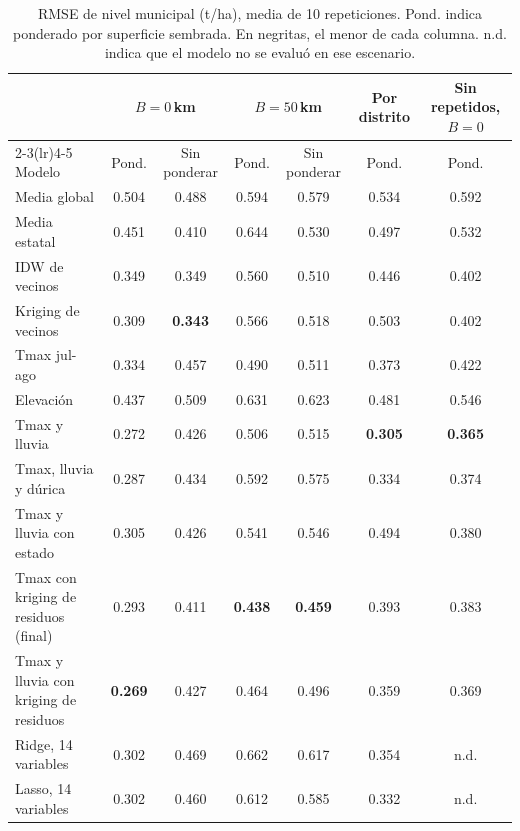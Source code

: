 \begin{table}[t]
\centering
\caption{RMSE de nivel municipal (t/ha), media de 10 repeticiones. Pond. indica ponderado por superficie sembrada.
En negritas, el menor de cada columna. n.d. indica que el modelo no se evaluó en ese escenario.}
\label{tab:modelos}
\footnotesize
\begin{tabular}{@{}lcccccc@{}}
\toprule
 & \multicolumn{2}{c}{$B = 0$\,km} & \multicolumn{2}{c}{$B = 50$\,km} & Por distrito & Sin repetidos, $B = 0$ \\
\cmidrule(lr){2-3}\cmidrule(lr){4-5}
Modelo & Pond. & Sin ponderar & Pond. & Sin ponderar & Pond. & Pond. \\
\midrule
Media global & 0.504 & 0.488 & 0.594 & 0.579 & 0.534 & 0.592 \\
Media estatal & 0.451 & 0.410 & 0.644 & 0.530 & 0.497 & 0.532 \\
IDW de vecinos & 0.349 & 0.349 & 0.560 & 0.510 & 0.446 & 0.402 \\
Kriging de vecinos & 0.309 & \textbf{0.343} & 0.566 & 0.518 & 0.503 & 0.402 \\\midrule
Tmax jul-ago & 0.334 & 0.457 & 0.490 & 0.511 & 0.373 & 0.422 \\
Elevación & 0.437 & 0.509 & 0.631 & 0.623 & 0.481 & 0.546 \\
Tmax y lluvia & 0.272 & 0.426 & 0.506 & 0.515 & \textbf{0.305} & \textbf{0.365} \\
Tmax, lluvia y dúrica & 0.287 & 0.434 & 0.592 & 0.575 & 0.334 & 0.374 \\
Tmax y lluvia con estado & 0.305 & 0.426 & 0.541 & 0.546 & 0.494 & 0.380 \\\midrule
Tmax con kriging de residuos (final) & 0.293 & 0.411 & \textbf{0.438} & \textbf{0.459} & 0.393 & 0.383 \\
Tmax y lluvia con kriging de residuos & \textbf{0.269} & 0.427 & 0.464 & 0.496 & 0.359 & 0.369 \\\midrule
Ridge, 14 variables & 0.302 & 0.469 & 0.662 & 0.617 & 0.354 & n.d. \\
Lasso, 14 variables & 0.302 & 0.460 & 0.612 & 0.585 & 0.332 & n.d. \\
\bottomrule
\end{tabular}
\end{table}